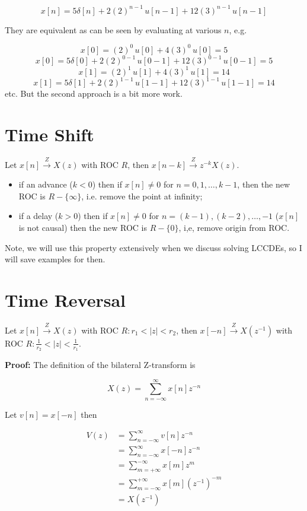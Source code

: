 \documentclass{article}
\begin{document}
$$
	x[n] = 5\delta[n] + 2(2)^{n-1}\, u[n-1] + 12(3)^{n-1}\, u[n-1]
$$

They are equivalent as can be seen by evaluating at various $n$, e.g.

$$
	x[0] = (2)^0\, u[0] + 4(3)^0\, u[0] = 5
$$
$$
	x[0] = 5\delta[0] + 2(2)^{0-1}\, u[0-1] + 12(3)^{0-1}\, u[0-1] = 5
$$
$$
	x[1] = (2)^1\, u[1] + 4(3)^1\, u[1] = 14
$$
$$
	x[1] = 5\delta[1] + 2(2)^{1-1}\, u[1-1] + 12(3)^{1-1}\, u[1-1] = 14
$$
etc. But the second approach is a bit more work.

\section{Time Shift}

Let $x[n] \stackrel{Z}{\longrightarrow} X(z)$ with ROC $R$, then $x[n-k] \stackrel{Z}{\longrightarrow} z^{-k} X(z)$.

\begin{itemize}
	\item if an advance ($k < 0$) then if $x[n] \neq 0$ for $n = 0, 1, \ldots, k-1$, then the new ROC is $R - \{\infty\}$, i.e. remove the point at infinity;
	\item if a delay ($k > 0$) then if $x[n] \neq 0$ for $n = (k-1), (k-2), \dots, -1$ ($x[n]$ is not causal) then the new ROC is $R - \{0\}$, i,e, remove origin from ROC.
\end{itemize}

Note, we will use this property extensively when we discuss solving LCCDEs, so I will save examples for then.

\section{Time Reversal}

Let $x[n] \stackrel{Z}{\longrightarrow} X(z)$ with ROC $R: r_1 < |z| < r_2$, then $x[-n] \stackrel{Z}{\longrightarrow} X\left(z^{-1}\right)$ with ROC $R: \frac{1}{r_2} < |z| < \frac{1}{r_1}$.

\textbf{Proof:} The definition of the bilateral Z-transform is

\[
	X(z) = \sum_{n=-\infty}^{\infty} x[n] z^{-n}
\]

Let $v[n] = x[-n]$ then

\begin{align*}
	V(z) & = \sum_{n=-\infty}^{\infty} v[n] z^{-n}                    \\
	     & = \sum_{n=-\infty}^{\infty} x[-n] z^{-n}                   \\
	     & = \sum_{m=+\infty}^{-\infty} x[m] z^{m}                    \\
	     & = \sum_{m=-\infty}^{+\infty} x[m] \left(z^{-1}\right)^{-m} \\
	     & = X\left(z^{-1}\right)
\end{align*}
\end{document}
